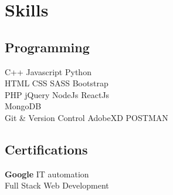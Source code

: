 \documentclass[]{deedy-resume-openfont}
\begin{document}
\begin{minipage}[t]{0.33\textwidth}

\section{Skills}
\subsection{Programming}
\vspace{\topsep}
\textbullet{}   C++ \textbullet{} Javascript \textbullet{} Python \\
\vspace{\topsep}
\textbullet{} HTML \textbullet{} CSS \textbullet{} SASS \textbullet{} Bootstrap\\ \textbullet{} PHP
\textbullet{} jQuery \textbullet{} NodeJs \textbullet{} ReactJs \\
 \textbullet{} MongoDB \\
\vspace{\topsep}
 \textbullet{} Git \& Version Control \textbullet{} AdobeXD \textbullet{} POSTMAN
\sectionsep

\subsection{Certifications}
\textbullet{} \textbf{Google} IT automation \\
\textbullet{} Full Stack Web Development
\sectionsep

%
%

\end{minipage} 
\hfill
\end{document}

